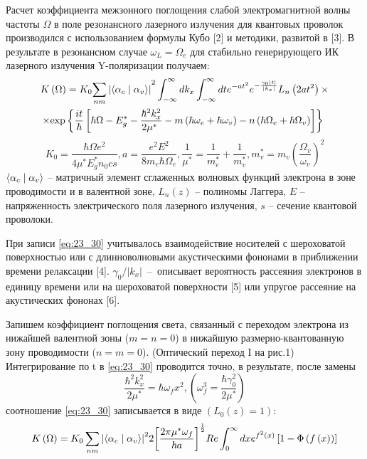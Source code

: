 {Расчет коэффициента межзонного поглощения слабой электромагнитной волны частоты $\Omega$ в поле резонансного лазерного излучения для квантовых проволок производился с использованием формулы Кубо \cite{Kubo1957a}[2] и методики, развитой в \cite{Sinyavskii1974}[3]. В результате в резонансном случае ${\omega }_L=\Omega_e$ для стабильно генерирующего ИК лазерного излучения Y-поляризации получаем:
\begin{multline} \label{eq:23_30}
K\left(\Omega\right)=K_0{\sum_{nm}{\left|\left\langle {\alpha }_c\mathrel{\left|\vphantom{{\alpha }_c {\alpha }_v}\right.\kern-\nulldelimiterspace}{\alpha }_v\right\rangle \right|}}^2\int^{\infty }_{-\infty }{dk_x}\int^{\infty }_{-\infty }{dt}e^{-at^2}e^{-\frac{{\gamma }_0\left|t\right|}{\left|k_x\right|}}L_n\left(2at^2\right)\times\\
\times {\exp \left\{\frac{it}{\hbar }\left[\hbar \Omega-E^*_g-\frac{{\hbar }^2k^2_x}{2{\mu }^*\ }-m\left(\hbar {\omega }_e+\hbar {\omega }_v\right)-n\left(\hbar \Omega_e+\hbar \Omega_v\right)\right]\right\}\ }
\end{multline}
\[
K_0=\frac{\hbar \Omega e^2}{4{\mu }^*E^*_gn_0cs}, 
a=\frac{e^2E^2}{8m_e\hbar \Omega_e}, \frac{1}{{\mu }^*}=\frac{1}{m^*_e}+\frac{1}{m^*_v}, m^*_v=m_v{\left(\frac{\Omega_v}{{\omega }_v}\right)}^2
\] 
$\left\langle {\alpha }_c\mathrel{\left|\vphantom{{\alpha }_c {\alpha }_v}\right.\kern-\nulldelimiterspace}{\alpha }_v\right\rangle $ -- матричный элемент сглаженных волновых функций электрона в зоне проводимости и в валентной зоне, $L_n\left(z\right)$ -- полиномы Лаггера, $E$ -- напряженность электрического поля лазерного излучения, $s$ -- сечение квантовой проволоки. 

При записи \eqref{eq:23_30} учитывалось взаимодействие носителей с шероховатой поверхностью или с длинноволновыми акустическими фононами в приближении времени релаксации \cite{Khamidullin2002}[4]. ${{\gamma }_0}/{\left|k_x\right|}$~--~описывает вероятность рассеяния электронов в единицу времени или на шероховатой поверхности \cite{Karapetyan2012}[5] или упругое рассеяние на акустических фононах \cite{Khamidullin2006}[6].

Запишем коэффициент поглощения света, связанный с переходом электрона из нижайшей валентной зоны ($m=n=0$) в нижайшую размерно-квантованную зону проводимости ($n=m=0$). (Оптический переход I на рис.1) Интегрирование по t в  \eqref{eq:23_30} проводится точно, в результате, после замены
\[
\frac{{\hbar }^2k^2_x}{2{\mu }^*}=\hbar {\omega }_fx^2, \left({\omega }^3_f=\frac{\hbar {\gamma }^2_0}{2{\mu }^*}\right)
\] 
соотношение  \eqref{eq:23_30} записывается в виде $\left(L_0\left(z\right)=1\right)$:
\begin{equation} \label{eq:23_40}
K\left(\Omega\right)=K_0\sum_{nm}{{\left|\left\langle {\alpha }_c\mathrel{\left|\vphantom{{\alpha }_c {\alpha }_v}\right.\kern-\nulldelimiterspace}{\alpha }_v\right\rangle \right|}^2}2{\left[\frac{2\pi {\mu }^*{\omega }_f}{\hbar a}\right]}^{\frac{1}{2}}Re\int^{\infty }_0{dx}e^{f^2\left(x\right)}\left[1-\Phi \left(f\left(x\right)\right)\right]
\end{equation}

}
